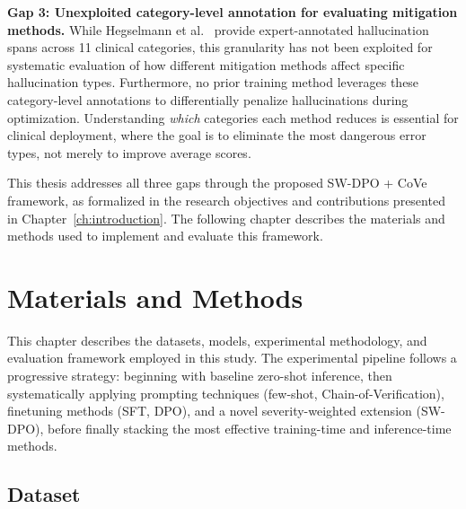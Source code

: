 \documentclass[12pt,a4paper,oneside]{report}
\begin{document}
\textbf{Gap 3: Unexploited category-level annotation for evaluating mitigation methods.} While Hegselmann et al.~\cite{hegselmann2024datacentric} provide expert-annotated hallucination spans across 11 clinical categories, this granularity has not been exploited for systematic evaluation of how different mitigation methods affect specific hallucination types. Furthermore, no prior training method leverages these category-level annotations to differentially penalize hallucinations during optimization. Understanding \textit{which} categories each method reduces is essential for clinical deployment, where the goal is to eliminate the most dangerous error types, not merely to improve average scores.

This thesis addresses all three gaps through the proposed SW-DPO + CoVe framework, as formalized in the research objectives and contributions presented in Chapter~\ref{ch:introduction}. The following chapter describes the materials and methods used to implement and evaluate this framework.



\chapter{Materials and Methods}
\label{ch:methods}


This chapter describes the datasets, models, experimental methodology, and evaluation framework employed in this study. The experimental pipeline follows a progressive strategy: beginning with baseline zero-shot inference, then systematically applying prompting techniques (few-shot, Chain-of-Verification), finetuning methods (SFT, DPO), and a novel severity-weighted extension (SW-DPO), before finally stacking the most effective training-time and inference-time methods.

\section{Dataset}
\label{sec:dataset}
\end{document}
